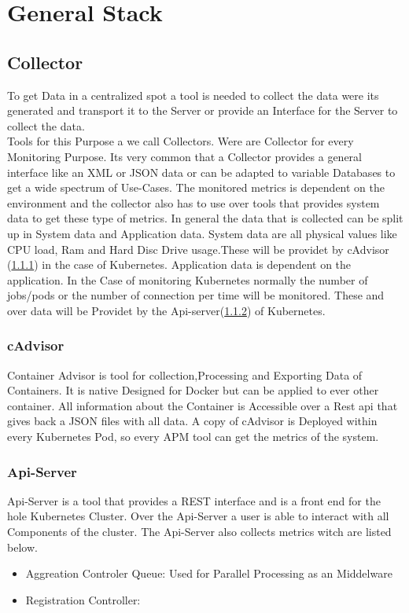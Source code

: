  
\chapter{General Stack}
\label{chap:ch2}
\section{Collector}
To get Data in a centralized spot a tool is needed to collect the data were its generated and transport it to the Server or provide an Interface for the Server to collect the data.\\
Tools for this Purpose a we call Collectors. Were are Collector for every Monitoring Purpose. Its very common that a Collector provides a general interface like an XML or JSON data or can be adapted to variable Databases to get a wide spectrum of Use-Cases. The monitored metrics is dependent on the environment and the collector also has to use over tools that provides system data to get these type of metrics. In general the data that is collected can be split up in System data and Application data. System data are all physical values like CPU load, Ram and Hard Disc Drive usage.These will be providet by cAdvisor (\ref{cadvisor}) in the case of Kubernetes. Application data is dependent on the application. In the Case of monitoring Kubernetes normally the number of jobs/pods or the number of connection per time will be monitored. These and over data will be Providet by the Api-server(\ref{apiserver}) of Kubernetes.
\subsection{cAdvisor}
\label{cadvisor}
Container Advisor is tool for collection,Processing and Exporting Data of Containers. It is native Designed for Docker but can be applied to ever other container. All information about the Container is Accessible over a Rest api that gives back a JSON files with all data. A copy of cAdvisor is Deployed within every Kubernetes Pod, so every APM tool can get the metrics of the system.
\subsection{Api-Server}
\label{apiserver} 
Api-Server is a tool that provides a REST interface and is a front end for the hole Kubernetes Cluster. Over the Api-Server a user is able to interact with all Components of the cluster. The Api-Server also collects metrics witch are listed below.\\
\begin{itemize}
	\item Aggreation Controler Queue: Used for Parallel Processing as an Middelware
	\item Registration Controller:  
\end{itemize} 

